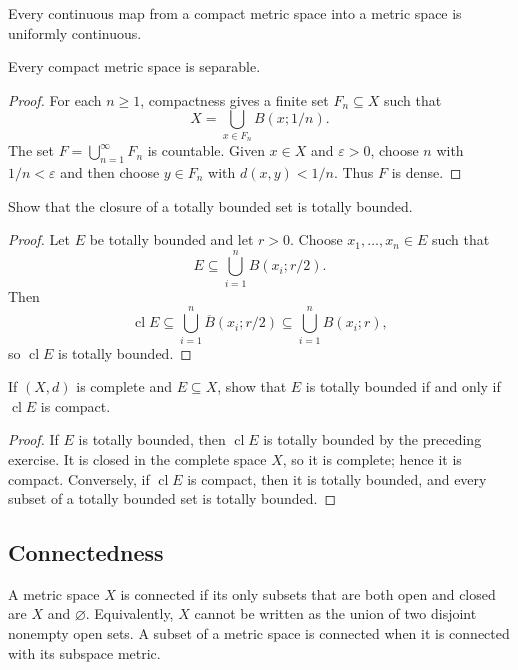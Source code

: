 \begin{thm}
Every continuous map from a compact metric space into a metric space is
uniformly continuous.
\end{thm}

\begin{thm}
Every compact metric space is separable.
\end{thm}

\begin{proof}
For each $n\geq1$, compactness gives a finite set $F_n\subseteq X$ such that
\[
X=\bigcup_{x\in F_n}B(x;1/n).
\]
The set $F=\bigcup_{n=1}^\infty F_n$ is countable. Given $x\in X$ and
$\varepsilon>0$, choose $n$ with $1/n<\varepsilon$ and then choose
$y\in F_n$ with $d(x,y)<1/n$. Thus $F$ is dense.
\end{proof}

\begin{ex}
Show that the closure of a totally bounded set is totally bounded.
\end{ex}

\begin{proof}
Let $E$ be totally bounded and let $r>0$. Choose
$x_1,\ldots,x_n\in E$ such that
\[
E\subseteq\bigcup_{i=1}^nB(x_i;r/2).
\]
Then
\[
\operatorname{cl}E
\subseteq\bigcup_{i=1}^n\overline B(x_i;r/2)
\subseteq\bigcup_{i=1}^nB(x_i;r),
\]
so $\operatorname{cl}E$ is totally bounded.
\end{proof}

\begin{ex}
If $(X,d)$ is complete and $E\subseteq X$, show that $E$ is totally bounded
if and only if $\operatorname{cl}E$ is compact.
\end{ex}

\begin{proof}
If $E$ is totally bounded, then $\operatorname{cl}E$ is totally bounded by the
preceding exercise. It is closed in the complete space $X$, so it is complete;
hence it is compact. Conversely, if $\operatorname{cl}E$ is compact, then it
is totally bounded, and every subset of a totally bounded set is totally
bounded.
\end{proof}

\subsection{Connectedness}

\begin{de}
A metric space $X$ is connected if its only subsets that are both open and
closed are $X$ and $\varnothing$. Equivalently, $X$ cannot be written as the
union of two disjoint nonempty open sets. A subset of a metric space is
connected when it is connected with its subspace metric.
\end{de}

